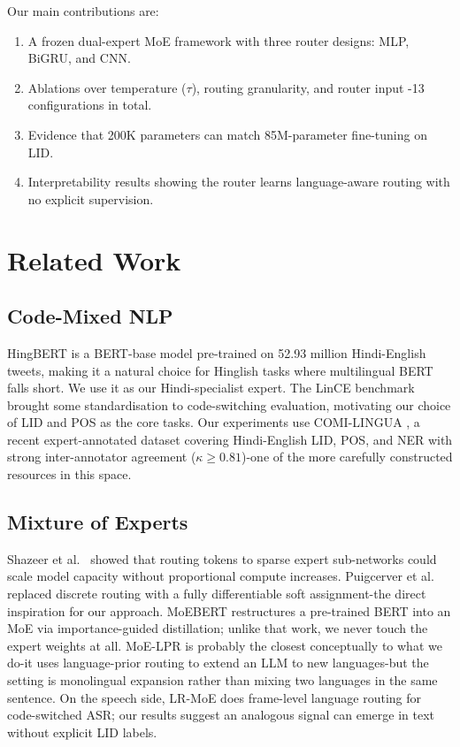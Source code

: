 \documentclass[conference]{IEEEtran}
\begin{document}
Our main contributions are:
\begin{enumerate}
  \item A frozen dual-expert MoE framework with three router designs: MLP, BiGRU, and CNN.
  \item Ablations over temperature ($\tau$), routing granularity, and router input -13 configurations in total.
  \item Evidence that 200K parameters can match 85M-parameter fine-tuning on LID.
  \item Interpretability results showing the router learns language-aware routing with no explicit supervision.
\end{enumerate}

\section{Related Work}

\subsection{Code-Mixed NLP}

HingBERT \cite{nayak2022hingbert} is a BERT-base model pre-trained on 52.93 million Hindi-English tweets, making it a natural choice for Hinglish tasks where multilingual BERT falls short. We use it as our Hindi-specialist expert. The LinCE benchmark \cite{aguilar2020lince} brought some standardisation to code-switching evaluation, motivating our choice of LID and POS as the core tasks. Our experiments use COMI-LINGUA \cite{sheth2024comilingua}, a recent expert-annotated dataset covering Hindi-English LID, POS, and NER with strong inter-annotator agreement ($\kappa \geq 0.81$)-one of the more carefully constructed resources in this space.

\subsection{Mixture of Experts}

Shazeer et al.\ \cite{shazeer2017moe} showed that routing tokens to sparse expert sub-networks could scale model capacity without proportional compute increases. Puigcerver et al.\ \cite{puigcerver2024softmoe} replaced discrete routing with a fully differentiable soft assignment-the direct inspiration for our approach. MoEBERT \cite{zuo2022moebert} restructures a pre-trained BERT into an MoE via importance-guided distillation; unlike that work, we never touch the expert weights at all. MoE-LPR \cite{zhou2024moelpr} is probably the closest conceptually to what we do-it uses language-prior routing to extend an LLM to new languages-but the setting is monolingual expansion rather than mixing two languages in the same sentence. On the speech side, LR-MoE \cite{wang2023lrmoe} does frame-level language routing for code-switched ASR; our results suggest an analogous signal can emerge in text without explicit LID labels.
\end{document}
